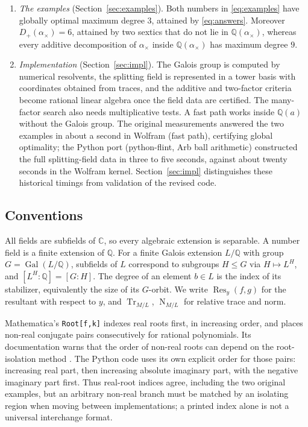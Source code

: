 \documentclass[11pt,a4paper]{article}
\theoremstyle{definition}
\theoremstyle{remark}
\newcommand{\Q}{\mathbb{Q}}
\newcommand{\C}{\mathbb{C}}
\newcommand{\Gal}{\operatorname{Gal}}
\newcommand{\Tr}{\operatorname{Tr}}
\newcommand{\Nm}{\operatorname{N}}
\newcommand{\Res}{\operatorname{Res}}
\newcommand{\Dp}{D_{+}}
\newcommand{\code}[1]{\texttt{#1}}
\begin{document}
\begin{enumerate}[label=(\roman*)]
  of three quadratic numbers but is neither a sum nor a product of two algebraic numbers of degree below
  four, even if Gaussian rational coefficients are allowed at every binary step.  With Gaussian
  coefficients the flat additive problem is again linear algebra, in $L(i)$.
\item \emph{The examples} (Section~\ref{sec:examples}).  Both numbers in \eqref{eq:examples} have
  globally optimal maximum degree $3$, attained by \eqref{eq:answers}.  Moreover $\Dp(\alpha_\times)=6$,
  attained by two sextics that do not lie in $\Q(\alpha_\times)$, whereas every additive decomposition
  of $\alpha_\times$ inside $\Q(\alpha_\times)$ has maximum degree $9$.
\item \emph{Implementation} (Section~\ref{sec:impl}).  The Galois group is computed by numerical
  resolvents, the splitting field is represented in a tower basis with coordinates obtained from traces,
  and the additive and two-factor criteria become rational linear algebra once the field data are certified.
  The many-factor search also needs multiplicative tests.  A fast path works inside
  $\Q(a)$ without the Galois group.  The original measurements answered the two examples in about a
  second in Wolfram (fast path), certifying global optimality; the Python port (python-flint, Arb ball
  arithmetic) constructed the full splitting-field data in three to five seconds, against about
  twenty seconds in the Wolfram kernel.  Section~\ref{sec:impl} distinguishes these historical timings
  from validation of the revised code.
\end{enumerate}

\subsection{Conventions}

All fields are subfields of $\C$, so every algebraic extension is separable.  A number field is a
finite extension of $\Q$.  For a finite Galois extension $L/\Q$ with group $G=\Gal(L/\Q)$, subfields of
$L$ correspond to subgroups $H\le G$ via $H\mapsto L^H$, and $[L^H:\Q]=[G:H]$.  The degree of an element
$b\in L$ is the index of its stabilizer, equivalently the size of its $G$-orbit.  We write $\Res_y(f,g)$
for the resultant with respect to $y$, and $\Tr_{M/L}$, $\Nm_{M/L}$ for relative trace and norm.

Mathematica's \code{Root[f,k]} indexes real roots first, in increasing order, and places non-real
conjugate pairs consecutively for rational polynomials.  Its documentation warns that the order of
non-real roots can depend on the root-isolation method \cite{WolframRoot}.  The Python code uses its
own explicit order for those pairs: increasing real part, then increasing absolute imaginary part,
with the negative imaginary part first.  Thus real-root indices agree, including the two original
examples, but an arbitrary non-real branch must be matched by an isolating region when moving between
implementations; a printed index alone is not a universal interchange format.
\end{document}
